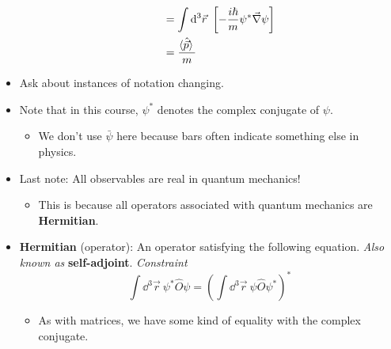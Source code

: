 \documentclass[../notes.tex]{subfiles}
\begin{document}
\begin{itemize}
\begin{itemize}
\begin{align*}
            &= \int\dd^3\vec{r}\ \left[ -\frac{i\hbar}{m}\psi^*\vec{\nabla}\psi \right]\\
            &= \frac{\langle{\hat{\vec{p}}}\rangle\,}{m}
        \end{align*}
    \end{itemize}
    \item Ask about instances of notation changing.
    \item Note that in this course, $\psi^*$ denotes the complex conjugate of $\psi$.
    \begin{itemize}
        \item We don't use $\bar{\psi}$ here because bars often indicate something else in physics.
    \end{itemize}
    \item Last note: All observables are real in quantum mechanics!
    \begin{itemize}
        \item This is because all operators associated with quantum mechanics are \textbf{Hermitian}.
    \end{itemize}
    \item \textbf{Hermitian} (operator): An operator satisfying the following equation. \emph{Also known as} \textbf{self-adjoint}. \emph{Constraint}
    \begin{equation*}
        \int\dd^3\vec{r}\ \psi^*\hat{O}\psi = \left( \int\dd^3\vec{r}\ \psi\hat{O}\psi^* \right)^*
    \end{equation*}
    \begin{itemize}
        \item As with matrices, we have some kind of equality with the complex conjugate.
    \end{itemize}
\end{itemize}
\end{document}
